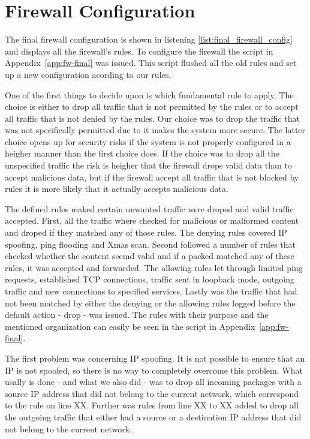 \section{Firewall Configuration}
\label{sec:config}

The final firewall configuration is shown in listening \ref{list:final_firewall_config} and displays all the firewall's rules. To configure the firewall the script in Appendix~\ref{app:fw-final} was issued. This script flushed all the old rules and set up a new configuration acording to our rules. 

One of the first things to decide upon is which fundamental rule to apply. The choice is either to drop all traffic that is not permitted by the rules or to accept all traffic that is not denied by the rules. Our choice was to drop the traffic that was not specifically permitted due to it makes the system more secure. The latter choice opens up for security risks if the system is not properly configured in a heigher manner than the first choice does. If the choice was to drop all the unspecified traffic the risk is heigher that the firewall drops valid data than to accept malicious data, but if the firewall accept all traffic that is not blocked by rules it is more likely that it actually accepts malicious data.

The defined rules maked certain unwanted traffic were droped and valid traffic accepted. First, all the traffic where checked for malicious or malformed content and droped if they matched any of those rules. The denying rules covered IP spoofing, ping flooding and Xmas scan. Second followed a number of rules that checked whether the content seemd valid and if a packed matched any of these rules, it was accepted and forwarded. The allowing rules let through limited ping requests, established TCP connections, traffic sent in loopback mode, outgoing traffic and new connections to specified services. Lastly was the traffic that had not been matched by either the denying or the allowing rules logged before the default action - drop - was issued. The rules with their purpose and the mentioned organization can easily be seen in the script in Appendix~\ref{app:fw-final}.

The first problem was concerning IP spoofing. It is not possible to ensure that an IP is not spoofed, so there is no way to completely overcome this problem. What usally is done - and what we also did - was to drop all incoming packages with a source IP address that did not belong to the current network, which correspond to the rule on line XX. Further was rules from line XX to XX added to drop all the outgoing traffic that either had a source or a destination IP address that did not belong to the current network. 

